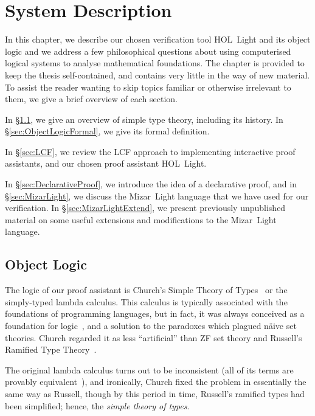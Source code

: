 \chapter{System Description}\label{chapter:System}
In this chapter, we describe our chosen verification tool HOL~Light and its object logic and we address a few philosophical questions about using computerised logical systems to analyse mathematical foundations. The chapter is provided to keep the thesis self-contained, and contains very little in the way of new material. To assist the reader wanting to skip topics familiar or otherwise irrelevant to them, we give a brief overview of each section.

In \S\ref{sec:ObjectLogic}, we give an overview of simple type theory, including its history. In \S\ref{sec:ObjectLogicFormal}, we give its formal definition. 

In \S\ref{sec:LCF}, we review the LCF approach to implementing interactive proof assistants, and our chosen proof assistant HOL~Light. 

In \S\ref{sec:DeclarativeProof}, we introduce the idea of a declarative proof, and in \S\ref{sec:MizarLight}, we discuss the Mizar~Light language that we have used for our verification. In \S\ref{sec:MizarLightExtend}, we present previously unpublished material on some useful extensions and modifications to the Mizar~Light language.

\section{Object Logic}\label{sec:ObjectLogic}
The logic of our proof assistant is Church's Simple Theory of Types~\cite{ChurchTheoryOfTypes} or the simply-typed lambda calculus. This calculus is typically associated with the foundations of programming languages, but in fact, it was always conceived as a foundation for logic~\cite{UntypedTheoryLambdaCalculus}, and a solution to the paradoxes which plagued n\"{a}ive set theories. Church regarded it as less ``artificial'' than ZF set theory and Russell's Ramified Type Theory~\cite{RussellTheoryOfTypes}.

The original lambda calculus turns out to be inconsistent (all of its terms are provably equivalent~\cite{InconsistencyLambdaCalculus}), and ironically, Church fixed the problem in essentially the same way as Russell, though by this period in time, Russell's ramified types had been simplified; hence, the \emph{simple theory of types}.

